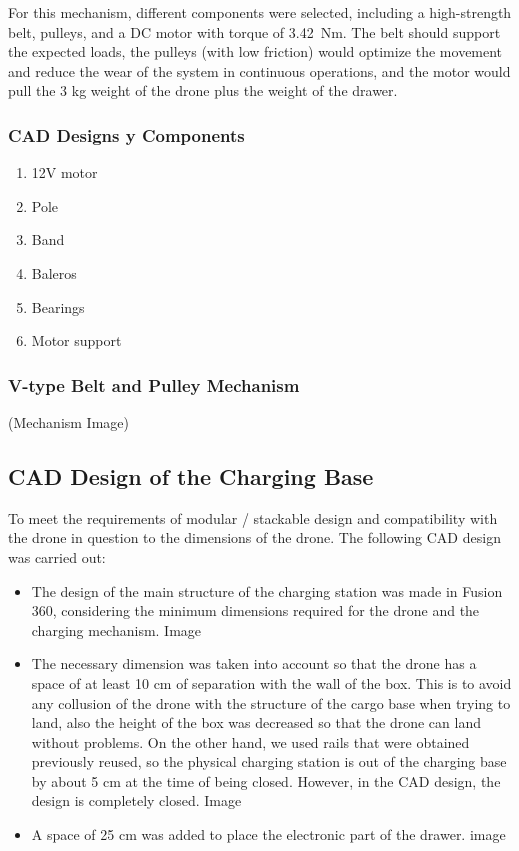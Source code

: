 For this mechanism, different components were selected, including a high-strength belt, pulleys, and a DC motor with torque of 3.42 Nm. The belt should support the expected loads, the pulleys (with low friction) would optimize the movement and reduce the wear of the system in continuous operations, and the motor would pull the 3 kg weight of the drone plus the weight of the drawer.
    \subsubsection{CAD Designs y Components}
        \begin{enumerate}
            \item 12V motor
            \item Pole
            \item Band
            \item Baleros
            \item Bearings 
            \item Motor support
        \end{enumerate}

    \subsubsection{V-type Belt and Pulley Mechanism}
    (Mechanism Image)

    \subsection{CAD Design of the Charging Base}
    To meet the requirements of modular / stackable design and compatibility with the drone in question to the dimensions of the drone. The following CAD design was carried out:

        \begin{itemize}
            \item     The design of the main structure of the charging station was made in Fusion 360, considering the minimum dimensions required for the drone and the charging mechanism.
            Image
            \item     The necessary dimension was taken into account so that the drone has a space of at least 10 cm of separation with the wall of the box. This is to avoid any collusion of the drone with the structure of the cargo base when trying to land, also the height of the box was decreased so that the drone can land without problems. On the other hand, we used rails that were obtained previously reused, so the physical charging station is out of the charging base by about 5 cm at the time of being closed. However, in the CAD design, the design is completely closed. 
            Image
            \item     A space of 25 cm was added to place the electronic part of the drawer.
            image
        \end{itemize}



